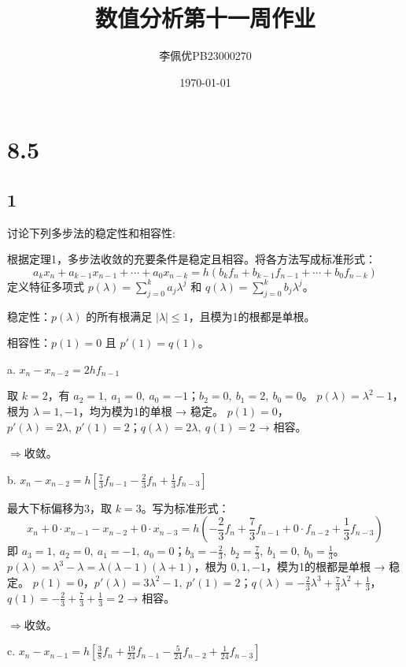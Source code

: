 \documentclass{article}
\title{数值分析第十一周作业}
\date{\today}
\author{李佩优PB23000270}
\begin{document}
\maketitle

\section*{8.5}

\subsection*{1}
讨论下列多步法的稳定性和相容性:

根据定理1，多步法收敛的充要条件是稳定且相容。将各方法写成标准形式：
\[
a_k x_n + a_{k-1}x_{n-1} + \cdots + a_0 x_{n-k} = h\left(b_k f_n + b_{k-1}f_{n-1} + \cdots + b_0 f_{n-k}\right)
\]
定义特征多项式 \(p(\lambda)=\sum_{j=0}^k a_j\lambda^j\) 和 \(q(\lambda)=\sum_{j=0}^k b_j\lambda^j\)。

稳定性：\(p(\lambda)\) 的所有根满足 \(|\lambda|\le 1\)，且模为1的根都是单根。 

相容性：\(p(1)=0\) 且 \(p'(1)=q(1)\)。

a. \(x_n - x_{n-2} = 2h f_{n-1}\)

取 \(k=2\)，有 \(a_2=1,\ a_1=0,\ a_0=-1\)；\(b_2=0,\ b_1=2,\ b_0=0\)。  
\(p(\lambda)=\lambda^2-1\)，根为 \(\lambda=1,-1\)，均为模为1的单根 → 稳定。  
\(p(1)=0\)，\(p'(\lambda)=2\lambda,\ p'(1)=2\)；\(q(\lambda)=2\lambda,\ q(1)=2\) → 相容。  

$\Rightarrow$收敛。

b. \(x_n - x_{n-2} = h\left[\frac{7}{3}f_{n-1} - \frac{2}{3}f_n + \frac{1}{3}f_{n-3}\right]\)

最大下标偏移为3，取 \(k=3\)。写为标准形式：
\[
x_n + 0\cdot x_{n-1} - x_{n-2} + 0\cdot x_{n-3} = h\left(-\frac{2}{3}f_n + \frac{7}{3}f_{n-1} + 0\cdot f_{n-2} + \frac{1}{3}f_{n-3}\right)
\]
即 \(a_3=1,\ a_2=0,\ a_1=-1,\ a_0=0\)；\(b_3=-\frac{2}{3},\ b_2=\frac{7}{3},\ b_1=0,\ b_0=\frac{1}{3}\)。  
\(p(\lambda)=\lambda^3-\lambda=\lambda(\lambda-1)(\lambda+1)\)，根为 \(0,1,-1\)，模为1的根都是单根 → 稳定。  
\(p(1)=0\)，\(p'(\lambda)=3\lambda^2-1,\ p'(1)=2\)；\(q(\lambda)=-\frac{2}{3}\lambda^3+\frac{7}{3}\lambda^2+\frac{1}{3}\)，\(q(1)=-\frac{2}{3}+\frac{7}{3}+\frac{1}{3}=2\) → 相容。  

$\Rightarrow$收敛。

c. \(x_n - x_{n-1} = h\left[\frac{3}{8}f_n + \frac{19}{24}f_{n-1} - \frac{5}{24}f_{n-2} + \frac{1}{24}f_{n-3}\right]\)
\end{document}
